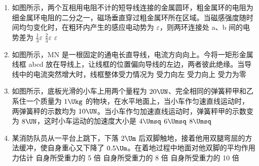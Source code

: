\documentclass[\gkver]{gaokaozhenti}
\begin{document}
\begin{enumerate}
\item
如图所示，两个互相用电阻不计的短导线连接的金属圆环，粗金属环的电阻为细金属环电阻的二分之一，磁场垂直穿过粗金属环所在区域。当磁感强度随时间均匀变化时，在粗环内产生的感应电动势为 $\varepsilon$，则两环连接处 a、b 间的电势差为
\onepicture[w=5.38cm]{}
{$\frac{1}{3}\varepsilon$}
{$\frac{2}{3}\varepsilon$}
{$\varepsilon$}

\item
如图所示，MN 是一根固定的通电长直导线，电流方向向上。今将一矩形金属线框 abcd 放在导线上，让线框的位置偏向导线的左边，两者彼此绝缘。当导线中的电流突然增大时，线框整体受力情况为
\onepicture[w=3.09cm]{}
{受力向左}
{受力向上}
{受力为零}

\item
如图所示，底板光滑的小车上用两个量程为 $20\UN$、完全相同的弹簧秤甲和乙系住一个质量为 $1\Ukg$ 的物块，在水平地面上，当小车作匀速直线运动时，两弹簧秤的示数均为 $10\UN$。当小车作匀加速直线运动时，弹簧秤甲的示数变为 $8\UN$，这时小车运动的加速度大小是
\onepicture[w=6.30cm]{}
\fourchoices[answer=B]
{$2\Umsq$}
{$4\Umsq$}
{$6\Umsq$}
{$8\Umsq$}

\item
某消防队员从一平台上跳下，下落 $2\Um$ 后双脚触地，接着他用双腿弯屈的方法缓冲，使自身重心又下降了 $0.5\Um$。在着地过程中地面对他双脚的平均作用力估计
{自身所受重力的 5 倍}
{自身所受重力的 8 倍}
{自身所受重力的 10 倍}


\end{enumerate}
\end{document}
